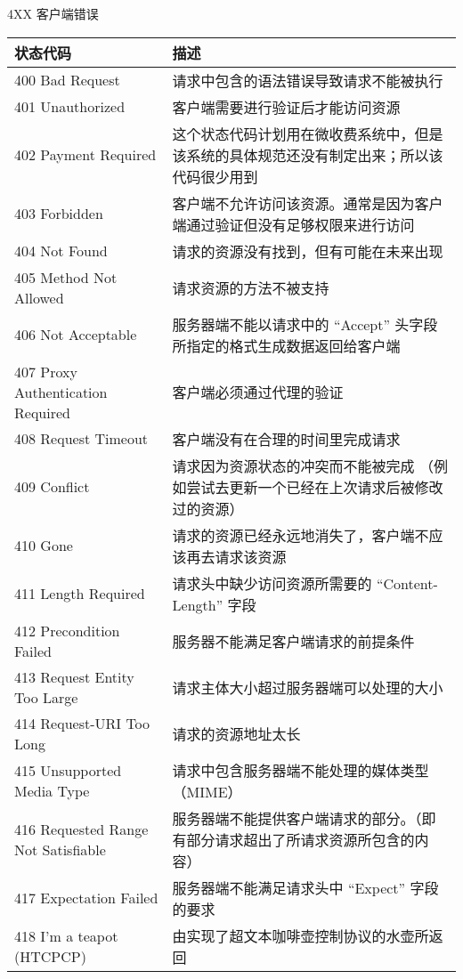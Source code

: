 \documentclass[final,table]{beamer}
\begin{document}
\begin{frame}{}
\begin{block}{\huge 4XX 客户端错误}
      \vspace{0.3in}

      \begin{tabular}{p{} p{}}
        状态代码 & 描述 \\ \hline
        400 Bad Request & 请求中包含的语法错误导致请求不能被执行 \\
        401 Unauthorized & 客户端需要进行验证后才能访问资源 \\
        402 Payment Required & 这个状态代码计划用在微收费系统中，但是该系统的具体规范还没有制定出来；所以该代码很少用到 \\
        403 Forbidden & 客户端不允许访问该资源。通常是因为客户端通过验证但没有足够权限来进行访问 \\
        404 Not Found & 请求的资源没有找到，但有可能在未来出现 \\
        405 Method Not Allowed & 请求资源的方法不被支持 \\
        406 Not Acceptable & 服务器端不能以请求中的 ``Accept'' 头字段所指定的格式生成数据返回给客户端 \\
        407 Proxy Authentication Required & 客户端必须通过代理的验证 \\
        408 Request Timeout & 客户端没有在合理的时间里完成请求 \\
        409 Conflict & 请求因为资源状态的冲突而不能被完成 （例如尝试去更新一个已经在上次请求后被修改过的资源） \\
        410 Gone & 请求的资源已经永远地消失了，客户端不应该再去请求该资源 \\
        411 Length Required & 请求头中缺少访问资源所需要的 ``Content-Length'' 字段 \\
        412 Precondition Failed & 服务器不能满足客户端请求的前提条件 \\
        413 Request Entity Too Large & 请求主体大小超过服务器端可以处理的大小 \\
        414 Request-URI Too Long & 请求的资源地址太长 \\
        415 Unsupported Media Type & 请求中包含服务器端不能处理的媒体类型（MIME） \\
        416 Requested Range Not Satisfiable & 服务器端不能提供客户端请求的部分。（即有部分请求超出了所请求资源所包含的内容） \\
        417 Expectation Failed & 服务器端不能满足请求头中 ``Expect'' 字段的要求 \\
        418 I'm a teapot (HTCPCP) & 由实现了超文本咖啡壶控制协议的水壶所返回 \\

\end{tabular}
\end{block}
\end{frame}
\end{document}
